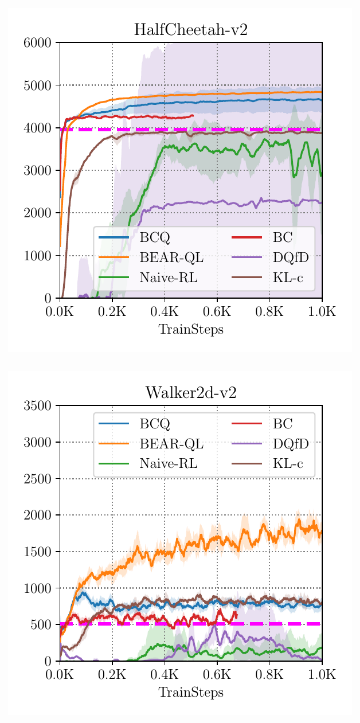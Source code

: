\begin{figure}
    \centering
    \begin{subfigure}[t]{0.23\textwidth}
        \centering
        \includegraphics[width=0.99\linewidth]{chapters/bear/images/images_camera_ready/cheetah_mediocre_camera_ready.pdf}
    \end{subfigure}
    \begin{subfigure}[t]{0.23\textwidth}
        \centering
        \includegraphics[width=0.99\linewidth]{chapters/bear/images/images_camera_ready/walker_mediocre_camera_ready.pdf}

\end{subfigure}
\end{figure}
